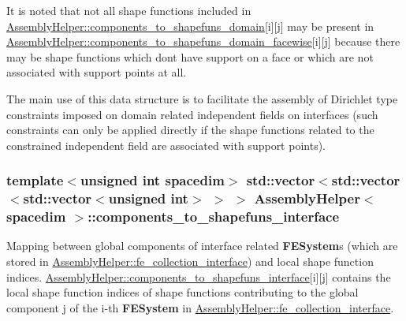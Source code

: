 It is noted that not all shape functions included in \hyperlink{class_assembly_helper_a0bdb6e2e2f9623f3f10dfa2ebe8e234c}{Assembly\+Helper\+::components\+\_\+to\+\_\+shapefuns\+\_\+domain}\mbox{[}{\ttfamily i}\mbox{]}\mbox{[}{\ttfamily j}\mbox{]} may be present in \hyperlink{class_assembly_helper_ae92560183f1d2060265f0744a84f0349}{Assembly\+Helper\+::components\+\_\+to\+\_\+shapefuns\+\_\+domain\+\_\+facewise}\mbox{[}{\ttfamily i}\mbox{]}\mbox{[}{\ttfamily j}\mbox{]} because there may be shape functions which don\textquotesingle{}t have support on a face or which are not associated with support points at all.

The main use of this data structure is to facilitate the assembly of Dirichlet type constraints imposed on domain related independent fields on interfaces (such constraints can only be applied directly if the shape functions related to the constrained independent field are associated with support points). 
\subsubsection[{\texorpdfstring{components\+\_\+to\+\_\+shapefuns\+\_\+interface}{components_to_shapefuns_interface}}]{\setlength{\rightskip}{0pt plus 5cm}template$<$unsigned int spacedim$>$ std\+::vector$<$std\+::vector$<$std\+::vector$<$unsigned int$>$ $>$ $>$ {\bf Assembly\+Helper}$<$ spacedim $>$\+::components\+\_\+to\+\_\+shapefuns\+\_\+interface\hspace{0.3cm}{\ttfamily [private]}}\hypertarget{class_assembly_helper_abcad51e64347fc3141d2840a2835b46c}{}\label{class_assembly_helper_abcad51e64347fc3141d2840a2835b46c}
Mapping between global components of interface related {\bf F\+E\+System}\textquotesingle{}s (which are stored in \hyperlink{class_assembly_helper_a8b4d224a9ecd2e926a8860829874d2a1}{Assembly\+Helper\+::fe\+\_\+collection\+\_\+interface}) and local shape function indices. \hyperlink{class_assembly_helper_abcad51e64347fc3141d2840a2835b46c}{Assembly\+Helper\+::components\+\_\+to\+\_\+shapefuns\+\_\+interface}\mbox{[}{\ttfamily i}\mbox{]}\mbox{[}{\ttfamily j}\mbox{]} contains the local shape function indices of shape functions contributing to the global component {\ttfamily j} of the {\ttfamily i-\/th} {\bf F\+E\+System} in \hyperlink{class_assembly_helper_a8b4d224a9ecd2e926a8860829874d2a1}{Assembly\+Helper\+::fe\+\_\+collection\+\_\+interface}. 
